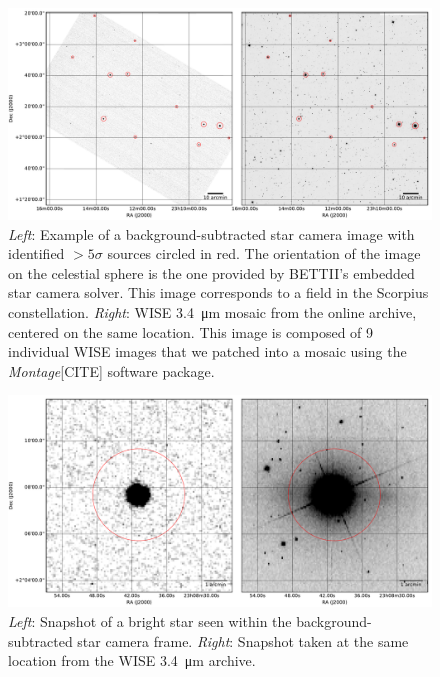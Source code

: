 \begin{landscape}
\begin{figure}[!ht]
	\centering
	\includegraphics[width=1.5\textwidth]{Figures/starcam_images.pdf}
	\caption[Star camera example WISE]{\textit{Left}: Example of a background-subtracted star camera image with identified $>5\sigma$ sources circled in red. The orientation of the image on the celestial sphere is the one provided by BETTII's embedded star camera solver. This image corresponds to a field in the Scorpius constellation. \textit{Right}: WISE \SI{3.4}{\um} mosaic from the online archive, centered on the same location. This image is composed of 9 individual WISE images that we patched into a mosaic using the \textit{Montage}[CITE] software package.}
	\label{fig:starcamexample}
    \end{figure}
\end{landscape}
\begin{landscape}
\begin{figure}[!ht]
	\centering
	\includegraphics[width=1.5\textwidth]{Figures/starcam_SDSSr_zoom.pdf}
	\caption[Star camera individual star]{\textit{Left}: Snapshot of a bright star seen within the background-subtracted star camera frame. \textit{Right}: Snapshot taken at the same location from the WISE \SI{3.4}{\um} archive.}
	\label{fig:starcamzoom}
    \end{figure}
\end{landscape}

